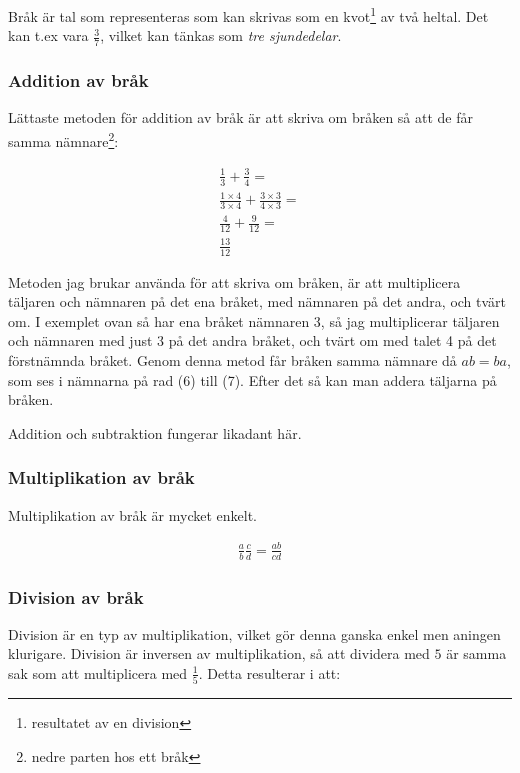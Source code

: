 Bråk är tal som representeras som kan skrivas som en kvot\footnote{resultatet av en division} av två heltal. Det kan t.ex vara $\frac{3}{7}$, vilket kan tänkas som  \textit{tre sjundedelar}.

\subsubsection{Addition av bråk}
\label{Addition av bråk}
Lättaste metoden för addition av bråk är att skriva om bråken så att de får samma nämnare\footnote{nedre parten hos ett bråk}:

\begin{align}
	\frac{1}{3} + \frac{3}{4} = \\
	\frac{1\times 4}{3\times 4} + \frac{3\times 3}{4\times 3} = \\
	\frac{4}{12} + \frac{9}{12} = \\
	\frac{13}{12}
\end{align}

Metoden jag brukar använda för att skriva om bråken, är att multiplicera täljaren och nämnaren på det ena bråket, med nämnaren på det andra, och tvärt om. I exemplet ovan så har ena bråket nämnaren 3, så jag multiplicerar täljaren och nämnaren med just 3 på det andra bråket, och tvärt om med talet 4 på det förstnämnda bråket. Genom denna metod får bråken samma nämnare då $ab = ba$, som ses i nämnarna på rad (6) till (7). Efter det så kan man addera täljarna på bråken.

Addition och subtraktion fungerar likadant här.

\subsubsection{Multiplikation av bråk}

Multiplikation av bråk är mycket enkelt.

\begin{align}
	\frac{a}{b} \frac{c}{d} = \frac{ab}{cd}
\end{align}

\subsubsection{Division av bråk}
\label{Division av bråk}

Division är en typ av multiplikation, vilket gör denna ganska enkel men aningen klurigare. Division är inversen av multiplikation, så att dividera med $5$ är samma sak som att multiplicera med $\frac{1}{5}$. Detta resulterar i att:

